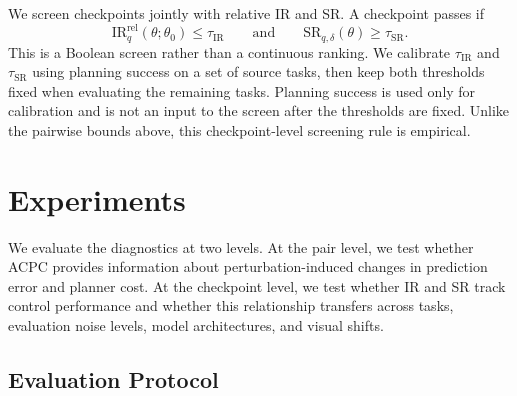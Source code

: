 \documentclass{article}
\newcommand{\stdmax}{\ensuremath{\sigma_{\max}}}
\begin{document}
We screen checkpoints jointly with relative IR and SR. A checkpoint passes if
\[
\mathrm{IR}^{\mathrm{rel}}_{q}(\theta;\theta_0)
\leq \tau_{\mathrm{IR}}
\qquad\text{and}\qquad
\mathrm{SR}_{q,\delta}(\theta)
\geq \tau_{\mathrm{SR}}.
\]
This is a Boolean screen rather than a continuous ranking. We calibrate
$\tau_{\mathrm{IR}}$ and $\tau_{\mathrm{SR}}$ using planning success on a set
of source tasks, then keep both thresholds fixed when evaluating the remaining
tasks. Planning success is used only for calibration and is not an input to
the screen after the thresholds are fixed. Unlike the pairwise bounds above,
this checkpoint-level screening rule is empirical.

\section{Experiments}\label{sec:exp}

We evaluate the diagnostics at two levels. At the pair level, we test whether
ACPC provides information about perturbation-induced changes in prediction
error and planner cost. At the checkpoint level, we test whether IR and SR
track control performance and whether this relationship transfers across tasks,
evaluation noise levels, model architectures, and visual shifts.

\subsection{Evaluation Protocol}\label{sec:bg}



\end{document}
